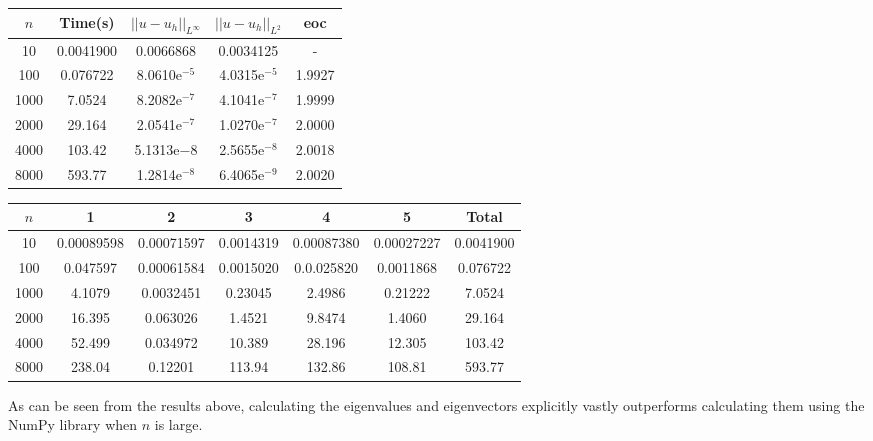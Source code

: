 \documentclass{article}
\numberwithin{equation}{section}
\begin{document}
\begin{table}[H]
\centering
\begin{tabular}{|c|c|c|c|c|}
\hline
$n$ & Time(s) & $|| u - u_h ||_{L^{\infty}}$ &$|| u - u_h ||_{L^{2}}$ & eoc \\
\hline
10 & 0.0041900 & 0.0066868 & 0.0034125 & - \\
100 & 0.076722 & 8.0610e$^{-5}$ & 4.0315e$^{-5}$ & 1.9927 \\
1000 & 7.0524 & 8.2082e$^{-7}$ & 4.1041e$^{-7}$ & 1.9999 \\
2000 & 29.164 & 2.0541e$^{-7}$ & 1.0270e$^{-7}$ & 2.0000 \\
4000 & 103.42 & 5.1313e${-8}$ & 2.5655e$^{-8}$ & 2.0018 \\
8000 & 593.77 & 1.2814e$^{-8}$ & 6.4065e$^{-9}$ & 2.0020 \\
\hline
\end{tabular}
\end{table}

\begin{table}[H]
\centering
\begin{tabular}{|c|c|c|c|c|c|c|}
\hline
$n$ & 1 & 2 & 3 & 4 & 5 & Total \\
\hline
10 & 0.00089598 & 0.00071597 & 0.0014319 & 0.00087380 & 0.00027227 & 0.0041900 \\
100 & 0.047597 & 0.00061584 & 0.0015020 & 0.0.025820 & 0.0011868 & 0.076722 \\
1000 & 4.1079 & 0.0032451 & 0.23045 & 2.4986 & 0.21222 & 7.0524 \\
2000 & 16.395 & 0.063026 & 1.4521 & 9.8474 & 1.4060 & 29.164 \\
4000 & 52.499 & 0.034972 & 10.389 & 28.196 & 12.305 & 103.42 \\
8000 & 238.04 & 0.12201 & 113.94 & 132.86 & 108.81 & 593.77 \\
\hline
\end{tabular}
\end{table}

As can be seen from the results above, calculating the eigenvalues and eigenvectors explicitly vastly outperforms calculating them using the NumPy library when $n$ is large.
\end{document}
